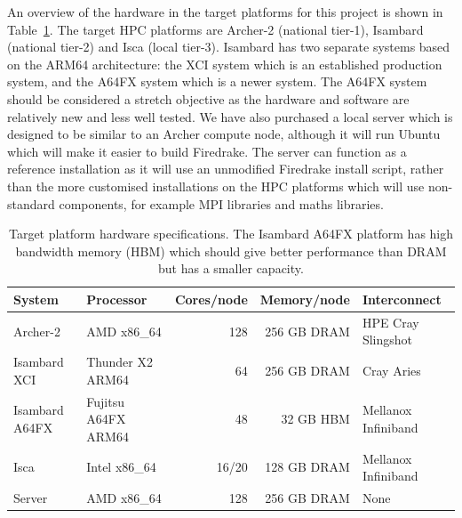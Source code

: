 \documentclass[a4paper,titlepage]{article}
\begin{document}
An overview of the hardware in the target platforms for this project is shown in Table~\ref{tab:hardware}. The target HPC platforms are Archer-2 (national tier-1), Isambard (national tier-2) and Isca (local tier-3). Isambard has two separate systems based on the ARM64 architecture: the XCI system which is an established production system, and the A64FX system which is a newer system. The A64FX system should be considered a stretch objective as the hardware and software are relatively new and less well tested. We have also purchased a local server which is designed to be similar to an Archer compute node, although it will run Ubuntu which will make it easier to build Firedrake. The server can function as a reference installation as it will use an unmodified Firedrake install script, rather than the more customised installations on the HPC platforms which will use non-standard components, for example MPI libraries and maths libraries. 
%
\begin{table}[htp]
\begin{center}
\begin{tabular}{|l|l|r|r|l|}
\hline 
System         & Processor        & Cores/node & Memory/node     & Interconnect \\
\hline
Archer-2       & AMD x86\_64         & 128        & 256 GB DRAM  & HPE Cray Slingshot  \\
Isambard XCI   & Thunder X2 ARM64    &  64        & 256 GB DRAM  & Cray Aries          \\
Isambard A64FX & Fujitsu A64FX ARM64 & 48         & 32 GB HBM    & Mellanox Infiniband \\
Isca           & Intel x86\_64       & 16/20      & 128 GB DRAM  & Mellanox Infiniband \\
Server         & AMD x86\_64         & 128        & 256 GB DRAM  & None                \\
\hline
\end{tabular}
\end{center}
\caption{Target platform hardware specifications. The Isambard A64FX platform has high bandwidth memory (HBM) which should give better performance than DRAM but has a smaller capacity.}
\label{tab:hardware}
\end{table}%
\end{document}

